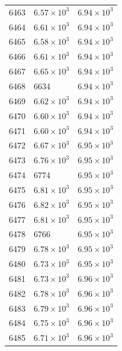\begin{table}[H]
\begin{tabular}{lll}
6463 & $\displaystyle 6.57 \times 10^{3}$ & $\displaystyle 6.94 \times 10^{3}$ \\
6464 & $\displaystyle 6.61 \times 10^{3}$ & $\displaystyle 6.94 \times 10^{3}$ \\
6465 & $\displaystyle 6.58 \times 10^{3}$ & $\displaystyle 6.94 \times 10^{3}$ \\
6466 & $\displaystyle 6.61 \times 10^{3}$ & $\displaystyle 6.94 \times 10^{3}$ \\
6467 & $\displaystyle 6.65 \times 10^{3}$ & $\displaystyle 6.94 \times 10^{3}$ \\
6468 & 6634 & $\displaystyle 6.94 \times 10^{3}$ \\
6469 & $\displaystyle 6.62 \times 10^{3}$ & $\displaystyle 6.94 \times 10^{3}$ \\
6470 & $\displaystyle 6.60 \times 10^{3}$ & $\displaystyle 6.94 \times 10^{3}$ \\
6471 & $\displaystyle 6.60 \times 10^{3}$ & $\displaystyle 6.94 \times 10^{3}$ \\
6472 & $\displaystyle 6.67 \times 10^{3}$ & $\displaystyle 6.95 \times 10^{3}$ \\
6473 & $\displaystyle 6.76 \times 10^{3}$ & $\displaystyle 6.95 \times 10^{3}$ \\
6474 & 6774 & $\displaystyle 6.95 \times 10^{3}$ \\
6475 & $\displaystyle 6.81 \times 10^{3}$ & $\displaystyle 6.95 \times 10^{3}$ \\
6476 & $\displaystyle 6.82 \times 10^{3}$ & $\displaystyle 6.95 \times 10^{3}$ \\
6477 & $\displaystyle 6.81 \times 10^{3}$ & $\displaystyle 6.95 \times 10^{3}$ \\
6478 & 6766 & $\displaystyle 6.95 \times 10^{3}$ \\
6479 & $\displaystyle 6.78 \times 10^{3}$ & $\displaystyle 6.95 \times 10^{3}$ \\
6480 & $\displaystyle 6.73 \times 10^{3}$ & $\displaystyle 6.95 \times 10^{3}$ \\
6481 & $\displaystyle 6.73 \times 10^{3}$ & $\displaystyle 6.96 \times 10^{3}$ \\
6482 & $\displaystyle 6.78 \times 10^{3}$ & $\displaystyle 6.96 \times 10^{3}$ \\
6483 & $\displaystyle 6.79 \times 10^{3}$ & $\displaystyle 6.96 \times 10^{3}$ \\
6484 & $\displaystyle 6.75 \times 10^{3}$ & $\displaystyle 6.96 \times 10^{3}$ \\
6485 & $\displaystyle 6.71 \times 10^{3}$ & $\displaystyle 6.96 \times 10^{3}$ \\

\end{tabular}
\end{table}
